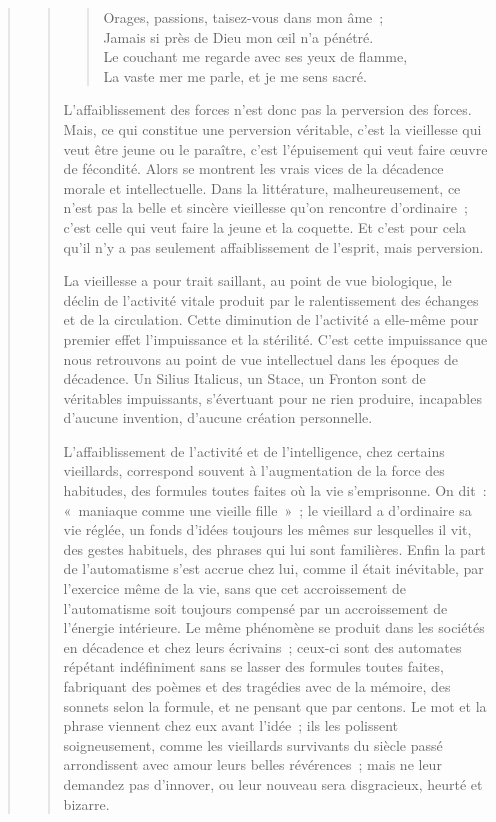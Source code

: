 \documentclass[french,twoside]{book} %
\begin{document}
\begin{verse}
\begin{verse}
\begin{verse}
Orages, passions, taisez-vous dans mon âme ;\\
Jamais si près de Dieu mon œil n’a pénétré.\\
Le couchant me regarde avec ses yeux de flamme,\\
La vaste mer me parle, et je me sens sacré.\\
\end{verse}

\noindent L’affaiblissement des forces n’est donc pas la perversion des forces. Mais, ce qui constitue une perversion véritable, c’est la vieillesse qui veut être jeune ou le paraître, c’est l’épuisement qui veut faire œuvre de fécondité. Alors se montrent les vrais vices de la décadence morale et intellectuelle. Dans la littérature, malheureusement, ce n’est pas la belle et sincère vieillesse qu’on rencontre d’ordinaire ; c’est celle qui veut faire la jeune et la coquette. Et c’est pour cela qu’il n’y a pas seulement affaiblissement de l’esprit, mais perversion.\par
La vieillesse a pour trait saillant, au point de vue biologique, le déclin de l’activité vitale produit par le ralentissement des échanges et de la circulation. Cette diminution de l’activité a elle-même pour premier effet l’impuissance et la stérilité. C’est cette impuissance que nous retrouvons au point de vue intellectuel dans les époques de décadence. Un Silius Italicus, un Stace, un Fronton sont de véritables impuissants, s’évertuant pour ne rien produire, incapables d’aucune invention, d’aucune création personnelle.\par
L’affaiblissement de l’activité et de l’intelligence, chez certains vieillards, correspond souvent à l’augmentation de la force des habitudes, des formules toutes faites où la vie s’emprisonne. On dit : « maniaque comme une vieille fille » ; le vieillard a d’ordinaire sa vie réglée, un fonds d’idées toujours les mêmes sur lesquelles il vit, des gestes habituels, des phrases qui lui sont familières. Enfin la part de l’automatisme s’est accrue chez lui, comme il était inévitable, par l’exercice même de la vie, sans que cet accroissement de l’automatisme soit toujours compensé par un accroissement de l’énergie intérieure. Le même phénomène se produit dans les sociétés en décadence et chez leurs écrivains ; ceux-ci sont des automates répétant indéfiniment sans se lasser des formules toutes faites, fabriquant des poèmes et des tragédies avec de la mémoire, des sonnets selon la formule, et ne pensant que par centons. Le mot et la phrase viennent chez eux avant l’idée ; ils les polissent soigneusement, comme les vieillards survivants du siècle passé arrondissent avec amour leurs belles révérences ; mais ne leur demandez pas d’innover, ou leur nouveau sera disgracieux, heurté et bizarre.\par

\end{verse}
\end{verse}
\end{document}
